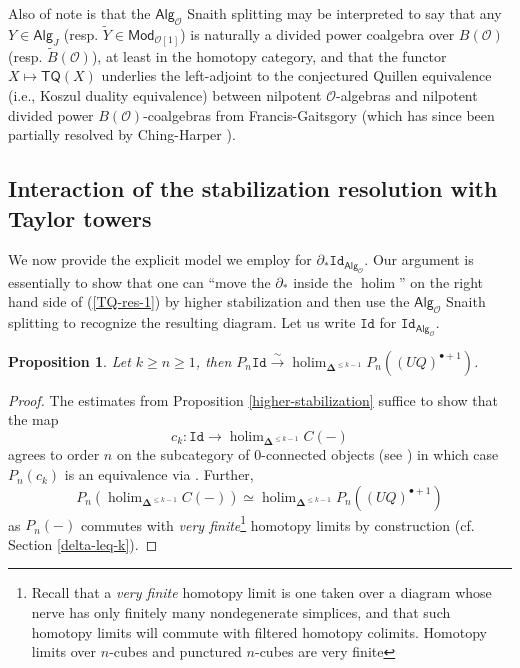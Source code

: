 \documentclass[11pt]{amsart}
\newtheorem{proposition}[subsection]{Proposition}
\theoremstyle{definition}
\theoremstyle{remark}
\newcommand{\TQ}{\mathsf{TQ}}
\newcommand{\holim}{\operatorname{holim}}
\newcommand{\Alg}[1]{ {\mathsf{Alg}_{\mathcal{#1}}} }
\newcommand{\Id}{\mathtt{Id}}
\newcommand{\Cal}[1]{\mathcal{#1}}
\newcommand{\bdel}{\mathbf{\Delta}}
\begin{document}
    Also of note is that the $\Alg{O}$ Snaith splitting may be interpreted to say that any $Y\in \mathsf{Alg}_J$ (resp. $\widetilde{Y}\in \mathsf{Mod}_{\Cal{O}[1]}$) is naturally a divided power coalgebra over $B(\Cal{O})$ (resp. $\widetilde{B}(\Cal{O})$), at least in the homotopy category, and that the functor $X\mapsto \TQ(X)$ underlies the left-adjoint to the conjectured Quillen equivalence (i.e., Koszul duality equivalence) between nilpotent $\Cal{O}$-algebras and nilpotent divided power $B(\Cal{O})$-coalgebras from Francis-Gaitsgory \cite{FG} (which has since been partially resolved by Ching-Harper \cite{Ching-Harper-Koszul}). 

\subsection{Interaction of the stabilization resolution with Taylor towers} \label{sec:fibrant-model}
We now provide the explicit model we employ for $\partial_* \Id_{\Alg{O}}$. Our argument is essentially to show that one can ``move the $\partial_*$ inside the $\holim$'' on the right hand side of (\ref{TQ-res-1}) by higher stabilization and then use the $\Alg{O}$ Snaith splitting to recognize the resulting diagram. Let us write $\Id$ for $\Id_{\Alg{O}}$.

\begin{proposition} \label{eq:P_n-equiv}
Let $k\geq n\geq 1$, then $P_n \Id \xrightarrow{\sim} \holim_{\bdel^{\leq k-1}} P_n ((UQ)^{\bullet+1})$.
\end{proposition} 

\begin{proof} 
The estimates from Proposition \ref{higher-stabilization} suffice to show that  the map \[c_k\colon \Id\to \holim_{\bdel^{\leq k-1}} C(-)\] agrees to order $n$ on the subcategory of $0$-connected objects (see \cite[1.2]{Goo-Calc3}) in which case $P_n (c_k)$ is an equivalence via \cite[1.6]{Goo-Calc3}. Further, \[P_n (\holim_{\bdel^{\leq k-1}} C(-)) \simeq \holim_{\bdel^{\leq k-1}} P_n  ((UQ)^{\bullet+1})\] as $P_n(-)$ commutes with \textit{very finite}\footnote{
    Recall that a \textit{very finite} homotopy limit is one taken over a diagram whose nerve has only finitely many nondegenerate simplices, and that such homotopy limits will commute with filtered homotopy colimits. Homotopy limits over $n$-cubes and punctured $n$-cubes are very finite
} homotopy limits by construction (cf. Section \ref{delta-leq-k}).  
\end{proof} 
\end{document}
